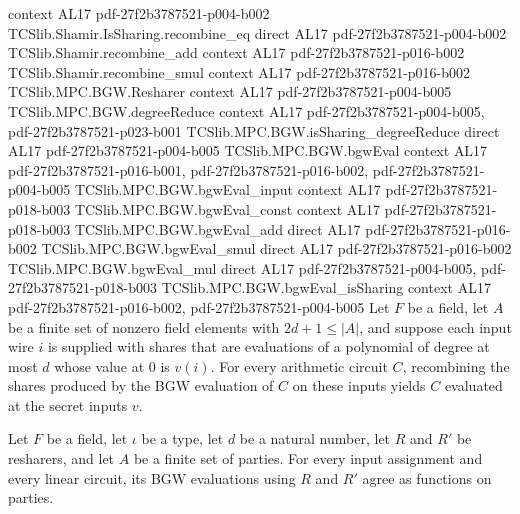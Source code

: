 \begin{theorem}
  {context}
  {AL17}
  {pdf-27f2b3787521-p004-b002}
\proofstep
  {TCSlib.Shamir.IsSharing.recombine_eq}
  {direct}
  {AL17}
  {pdf-27f2b3787521-p004-b002}
\proofstep
  {TCSlib.Shamir.recombine_add}
  {context}
  {AL17}
  {pdf-27f2b3787521-p016-b002}
\proofstep
  {TCSlib.Shamir.recombine_smul}
  {context}
  {AL17}
  {pdf-27f2b3787521-p016-b002}
\proofstep
  {TCSlib.MPC.BGW.Resharer}
  {context}
  {AL17}
  {pdf-27f2b3787521-p004-b005}
\proofstep
  {TCSlib.MPC.BGW.degreeReduce}
  {context}
  {AL17}
  {pdf-27f2b3787521-p004-b005,
    pdf-27f2b3787521-p023-b001}
\proofstep
  {TCSlib.MPC.BGW.isSharing_degreeReduce}
  {direct}
  {AL17}
  {pdf-27f2b3787521-p004-b005}
\proofstep
  {TCSlib.MPC.BGW.bgwEval}
  {context}
  {AL17}
  {pdf-27f2b3787521-p016-b001,
    pdf-27f2b3787521-p016-b002,
    pdf-27f2b3787521-p004-b005}
\proofstep
  {TCSlib.MPC.BGW.bgwEval_input}
  {context}
  {AL17}
  {pdf-27f2b3787521-p018-b003}
\proofstep
  {TCSlib.MPC.BGW.bgwEval_const}
  {context}
  {AL17}
  {pdf-27f2b3787521-p018-b003}
\proofstep
  {TCSlib.MPC.BGW.bgwEval_add}
  {direct}
  {AL17}
  {pdf-27f2b3787521-p016-b002}
\proofstep
  {TCSlib.MPC.BGW.bgwEval_smul}
  {direct}
  {AL17}
  {pdf-27f2b3787521-p016-b002}
\proofstep
  {TCSlib.MPC.BGW.bgwEval_mul}
  {direct}
  {AL17}
  {pdf-27f2b3787521-p004-b005,
    pdf-27f2b3787521-p018-b003}
\proofstep
  {TCSlib.MPC.BGW.bgwEval_isSharing}
  {context}
  {AL17}
  {pdf-27f2b3787521-p016-b002,
    pdf-27f2b3787521-p004-b005}
Let $F$ be a field, let $A$ be a finite set of nonzero field elements with $2d+1\le
|A|$, and suppose each input wire $i$ is supplied with shares that are evaluations of a
polynomial of degree at most $d$ whose value at $0$ is $v(i)$. For every arithmetic
circuit $C$, recombining the shares produced by the BGW evaluation of $C$ on these
inputs yields $C$ evaluated at the secret inputs $v$.
\end{theorem}

\begin{theorem}
\label{TCSlib.MPC.BGW.bgwEval_of_isLinear}
\leanok
{}
Let $F$ be a field, let $\iota$ be a type, let $d$ be a natural number, let $R$ and $R'$
be resharers, and let $A$ be a finite set of parties. For every input assignment and
every linear circuit, its BGW evaluations using $R$ and $R'$ agree as functions on
parties.
\end{theorem}

